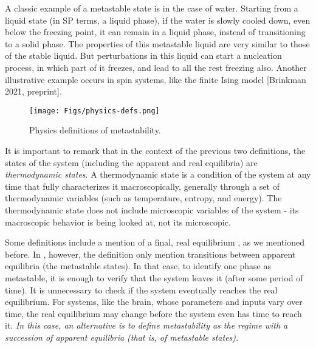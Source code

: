 \documentclass[preprint,superscriptaddress,showpacs,amsmath,amssymb,aps,pre,floatfix]{revtex4-1}
\theoremstyle{definition}
\begin{document}
A classic example of a metastable state is in the case of water. Starting from a liquid state (in SP terms, a liquid phase), if the water is slowly cooled down, even below the freezing point, it can remain in a liquid phase, instead of transitioning to a solid phase. The properties of this metastable liquid are very similar to those of the stable liquid. But perturbations in this liquid can start a nucleation process, in which part of it freezes, and lead to all the rest freezing also. Another illustrative example occurs in spin systems, like the finite Ising model [Brinkman 2021, preprint].
%
\begin{figure}
    \centering
    \texttt{[image: Figs/physics-defs.png]}
    \caption{Physics definitions of metastability.}
    \label{fig:physdefs}
\end{figure}


It is important to remark that in the context of the previous two definitions, the states of the system (including the apparent and real equilibria) are \textit{thermodynamic states}.  A thermodynamic state is a condition of the system at any time that fully characterizes it macroscopically, generally through a set of thermodynamic variables (such as temperature, entropy, and energy).  The thermodynamic state does not include microscopic variables of the system - its macroscopic behavior is being looked at, not its microscopic.

Some definitions include a mention of a final, real equilibrium \cite{olivieri_2005}, as we mentioned before. In \cite{bovier_2009}, however, the definition only mention transitions between apparent equilibria (the metastable states).
In that case, to identify one phase as metastable, it is enough to verify that the system leaves it (after some period of time). It is unnecessary to check if the system eventually reaches the real equilibrium. For systems, like the brain, whose parameters and inputs vary over time, the real equilibrium may change before the system even has time to reach it. {\it In this case, an alternative is to define metastability as the regime with a succession of apparent equilibria (that is, of metastable states). }
\end{document}
